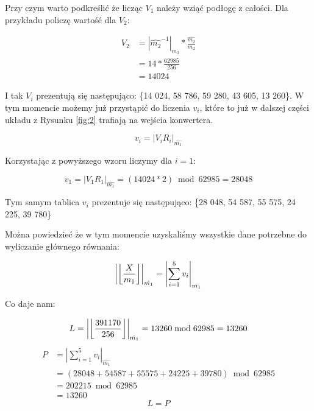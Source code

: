 \documentclass[comsoc]{IEEEtran}
\DeclarePairedDelimiter\floor{\lfloor}{\rfloor}
\begin{document}
	Przy czym warto podkreślić że licząc $V_{1}$ należy wziąć podłogę z całości. Dla przykładu policzę wartość dla $V_{2}$:
	
	\begin{equation} \label{eq:V1}
	\begin{aligned}
	V_{2}{} & =|\hat{m_{2}}^{-1}|_{m_{2}} * \frac{\hat{m_{2}}}{m_{2}}\\& = 14 * \frac{62985}{256}\\& = 14024
	\end{aligned}
	\end{equation}
	
	I tak $V_{i}$ prezentują się następująco: \{14 024, 58 786, 59 280, 43 605, 13 260\}. W tym momencie możemy już przystąpić do liczenia $v_{i}$, które to już w dalszej części układu z Rysunku \ref{fig:2} trafiają na wejścia konwertera.
	
	\begin{equation} \label{eq:vogol}
	v_{i} = |V_{i}R_{i}|_{\hat{m_{1}}}
	\end{equation}
	
	Korzystając z powyższego wzoru liczymy dla $i=1$:
	
	\begin{equation} \label{eq:v1}
	v_{1} = |V_{1}R_{1}|_{\hat{m_{1}}} = (14 024 * 2) \bmod 62985 = 28 048
	\end{equation}
	
	Tym samym tablica $v_{i}$ prezentuje się następująco: \{28 048, 54 587, 55 575, 24 225, 39 780\}
	
	Można powiedzieć że w tym momencie uzyskaliśmy wszystkie dane potrzebne do wyliczanie głównego równania:
	
	\begin{equation} \label{eq:wielkie}
	\left|\floor*{\frac{X}{m_{1}}}\right|_{\hat{m_{1}}} = \left|\sum_{i=1}^{5}v_{i}\right|_{\hat{m_{1}}}
	\end{equation}
	
	Co daje nam:
	
	\begin{equation} \label{eq:wielkieWynikL}
	L = \left|\floor*{\frac{391 170}{256}}\right|_{\hat{m_{1}}} = 13260 \bmod 62985 = 13260
	\end{equation}
	\begin{equation} \label{eq:wielkieWynikP}
	\begin{aligned}
	P {} & = \left|\sum_{i=1}^{5}v_{i}\right|_{\hat{m_{1}}}\\& = (28048+54587+55575+24225+39780) \bmod 62985\\& = 202215 \bmod 62985\\& = 13260
	\end{aligned}
	\end{equation}
	\begin{equation} \label{eq:wielkieWynik}
	L = P
	\end{equation}
	
\end{document}

